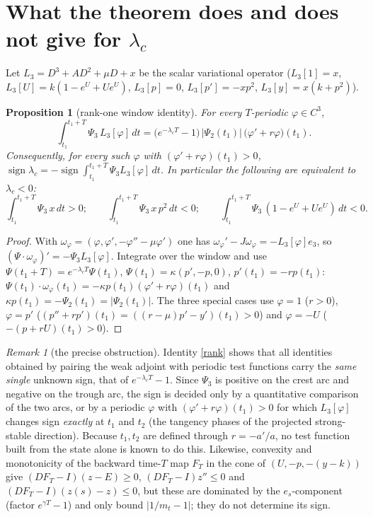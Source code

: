 \documentclass[11pt,a4paper]{article}
\newtheorem{proposition}[theorem]{Proposition}
\theoremstyle{remark}\newtheorem{remark}[theorem]{Remark}
\begin{document}
\section{What the theorem does and does not give for $\lambda_c$}
\label{sec:obstruction}
Let $L_3=D^3+AD^2+\mu D+x$ be the scalar variational operator
($L_3[1]=x$, $L_3[U]=k(1-e^U+Ue^U)$, $L_3[p]=0$, $L_3[p']=-xp^2$, $L_3[y]=x(k+p^2)$).
\begin{proposition}[rank-one window identity]\label{prop:rank}
For every $T$-periodic $\varphi\in C^3$,
\begin{equation}\label{rank}
\int_{t_1}^{t_1+T}\Psi_3\,L_3[\varphi]\,dt
=\bigl(e^{-\lambda_cT}-1\bigr)\,\bigl|\Psi_2(t_1)\bigr|\,\bigl(\varphi'+r\varphi\bigr)(t_1).
\end{equation}
Consequently, for every such $\varphi$ with $(\varphi'+r\varphi)(t_1)>0$,
$\operatorname{sign}\lambda_c=-\operatorname{sign}\int_{t_1}^{t_1+T}\Psi_3L_3[\varphi]\,dt$.
In particular the following are equivalent to $\lambda_c<0$:
\[
\int_{t_1}^{t_1+T}\!\!\Psi_3\,x\,dt>0;\qquad
\int_{t_1}^{t_1+T}\!\!\Psi_3\,x\,p^2\,dt<0;\qquad
\int_{t_1}^{t_1+T}\!\!\Psi_3\,(1-e^U+Ue^U)\,dt<0 .
\]
\end{proposition}
\begin{proof}
With $\omega_\varphi=(\varphi,\varphi',-\varphi''-\mu\varphi')$ one has
$\omega_\varphi'-J\omega_\varphi=-L_3[\varphi]e_3$, so
$(\Psi\cdot\omega_\varphi)'=-\Psi_3L_3[\varphi]$. Integrate over the window and use
$\Psi(t_1+T)=e^{-\lambda_cT}\Psi(t_1)$, $\Psi(t_1)=\kappa(p',-p,0)$, $p'(t_1)=-rp(t_1)$:
$\Psi(t_1)\cdot\omega_\varphi(t_1)=-\kappa p(t_1)(\varphi'+r\varphi)(t_1)$ and
$\kappa p(t_1)=-\Psi_2(t_1)=|\Psi_2(t_1)|$. The three special cases use
$\varphi=1$ ($r>0$), $\varphi=p'$ ($(p''+rp')(t_1)=((r-\mu)p'-y')(t_1)>0$) and
$\varphi=-U$ ($-(p+rU)(t_1)>0$).
\end{proof}
\begin{remark}[the precise obstruction]
Identity \eqref{rank} shows that all identities obtained by pairing the weak adjoint with
periodic test functions carry the \emph{same single} unknown sign, that of
$e^{-\lambda_cT}-1$. Since $\Psi_3$ is positive on the crest arc and negative on the trough arc,
the sign is decided only by a quantitative comparison of the two arcs, or by a periodic
$\varphi$ with $(\varphi'+r\varphi)(t_1)>0$ for which $L_3[\varphi]$ changes sign \emph{exactly}
at $t_1$ and $t_2$ (the tangency phases of the projected strong-stable direction). Because
$t_1,t_2$ are defined through $r=-a'/a$, no test function built from the state alone is known to
do this. Likewise, convexity and monotonicity of the backward time-$T$ map $F_T$ in the cone of
$(U,-p,-(y-k))$ give $(DF_T-I)(z-E)\ge0$, $(DF_T-I)z''\le0$ and $(DF_T-I)(z(s)-z)\le0$, but these
are dominated by the $e_s$-component (factor $e^{\gamma T}-1$) and only bound $|1/m_t-1|$; they do
not determine its sign.
\end{remark}
\end{document}

